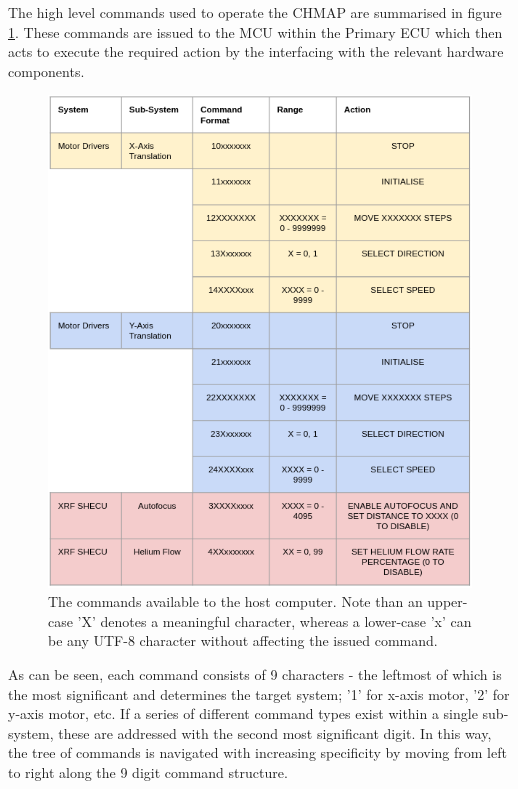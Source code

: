 The high level commands used to operate the CHMAP are summarised in figure \ref{fig:high-level-commands}. These commands are issued to the MCU within the Primary ECU which then acts to execute the required action by the interfacing with the relevant hardware components.

\begin{figure}
\centering
\includegraphics[width=1.0\textwidth]{Primary-ECU/figs/command-table.png}
\caption{\label{fig:high-level-commands}The commands available to the host computer. Note than an upper-case 'X' denotes a meaningful character, whereas a lower-case 'x' can be any UTF-8 character without affecting the issued command.}
\end{figure}

As can be seen, each command consists of 9 characters - the leftmost of which is the most significant and determines the target system; '1' for x-axis motor, '2' for y-axis motor, etc. If a series of different command types exist within a single sub-system, these are addressed with the second most significant digit. In this way, the tree of commands is navigated with increasing specificity by moving from left to right along the 9 digit command structure.

